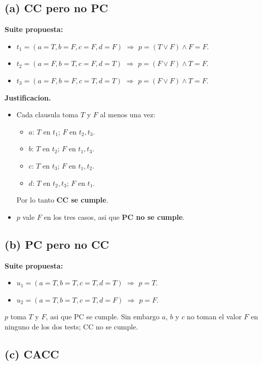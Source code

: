 \documentclass[12pt,a4paper]{article}
\begin{document}
\subsection{(a) CC pero no PC}

\textbf{Suite propuesta:}
\begin{itemize}
  \item $t_1 = (a=T,b=F,c=F,d=F)$ $\Rightarrow$ $p = (T \vee F) \wedge F = F$.
  \item $t_2 = (a=F,b=T,c=F,d=T)$ $\Rightarrow$ $p = (F \vee F) \wedge T = F$.
  \item $t_3 = (a=F,b=F,c=T,d=T)$ $\Rightarrow$ $p = (F \vee F) \wedge T = F$.
\end{itemize}

\textbf{Justificacion.}

\begin{itemize}
  \item Cada clausula toma $T$ y $F$ al menos una vez:
  \begin{itemize}
    \item $a$: $T$ en $t_1$; $F$ en $t_2, t_3$.
    \item $b$: $T$ en $t_2$; $F$ en $t_1, t_3$.
    \item $c$: $T$ en $t_3$; $F$ en $t_1, t_2$.
    \item $d$: $T$ en $t_2, t_3$; $F$ en $t_1$.
  \end{itemize}
  Por lo tanto \textbf{CC se cumple}.
  \item $p$ vale $F$ en los tres casos, asi que \textbf{PC no se cumple}.
\end{itemize}

\subsection{(b) PC pero no CC}

\textbf{Suite propuesta:}
\begin{itemize}
  \item $u_1 = (a=T,b=T,c=T,d=T)$ $\Rightarrow$ $p=T$.
  \item $u_2 = (a=T,b=T,c=T,d=F)$ $\Rightarrow$ $p=F$.
\end{itemize}

$p$ toma $T$ y $F$, asi que PC se cumple. Sin embargo $a$, $b$ y $c$ no toman el valor $F$ en
ninguno de los dos tests; CC no se cumple.

\subsection{(c) CACC}
\end{document}
